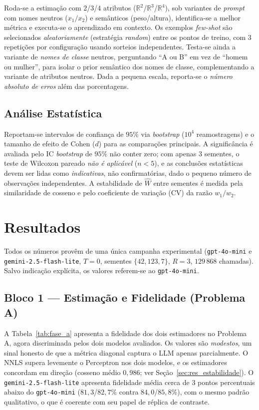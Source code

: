 \documentclass[12pt,a4paper]{article}
\newcommand{\West}{\ensuremath{\hat{W}}}   %
\begin{document}
Roda-se a
estimação com $2$/$3$/$4$ atributos ($\mathbb{R}^2$/$\mathbb{R}^3$/$\mathbb{R}^4$), sob
variantes de \emph{prompt} com
nomes neutros ($x_1/x_2$) e semânticos (peso/altura), identifica-se a melhor métrica e
executa-se o aprendizado em contexto. Os exemplos \emph{few-shot} são selecionados
\emph{aleatoriamente} (estratégia \emph{random}) entre os pontos de treino, com $3$
repetições por configuração usando sorteios independentes. Testa-se ainda a variante de
\emph{nomes de
classe} neutros, perguntando ``A ou B'' em vez de ``homem ou mulher'', para isolar o
prior semântico dos nomes de classe, complementando a variante de atributos
neutros. Dada a pequena escala, reporta-se o \emph{número absoluto de erros} além
das porcentagens.

\subsection{Análise Estatística}

Reportam-se intervalos de confiança de $95\%$ via \emph{bootstrap} ($10^4$ reamostragens)
e o tamanho de efeito de Cohen ($d$) para as comparações principais. A significância é
avaliada pelo IC \emph{bootstrap} de $95\%$ não conter zero; com apenas $3$ sementes, o
teste de Wilcoxon pareado \emph{não é aplicável} ($n<5$), e as conclusões estatísticas
devem ser lidas como \emph{indicativas}, não confirmatórias, dado o pequeno número de
observações independentes. A estabilidade de \West{} entre sementes é medida pela
similaridade de cosseno e pelo coeficiente de variação (CV) da razão $w_1/w_2$.

\section{Resultados}
\label{sec:resultados}

Todos os números provêm de uma única campanha experimental
(\texttt{gpt-4o-mini} e \texttt{gemini-2.5-flash-lite}, $T=0$, sementes $\{42,123,7\}$,
$R=3$, $129\,868$ chamadas). Salvo indicação explícita, os valores referem-se ao
\texttt{gpt-4o-mini}.

\subsection{Bloco 1 — Estimação e Fidelidade (Problema A)}

A Tabela~\ref{tab:fase_a} apresenta a fidelidade dos dois estimadores no Problema A, agora
discriminada pelos dois modelos avaliados. Os
valores são \emph{modestos}, um sinal honesto de que a métrica diagonal captura o LLM apenas
parcialmente. O NNLS supera levemente o Perceptron nos dois modelos, e os estimadores
concordam em direção (cosseno
médio $0{,}986$; ver Seção~\ref{sec:res_estabilidade}). O
\texttt{gemini-2.5-flash-lite} apresenta fidelidade média cerca de $3$ pontos percentuais
abaixo do \texttt{gpt-4o-mini} ($81{,}3$/$82{,}7\%$ contra $84{,}0$/$85{,}8\%$), com o
mesmo padrão qualitativo, o que é coerente com seu papel de réplica de contraste.
\end{document}
